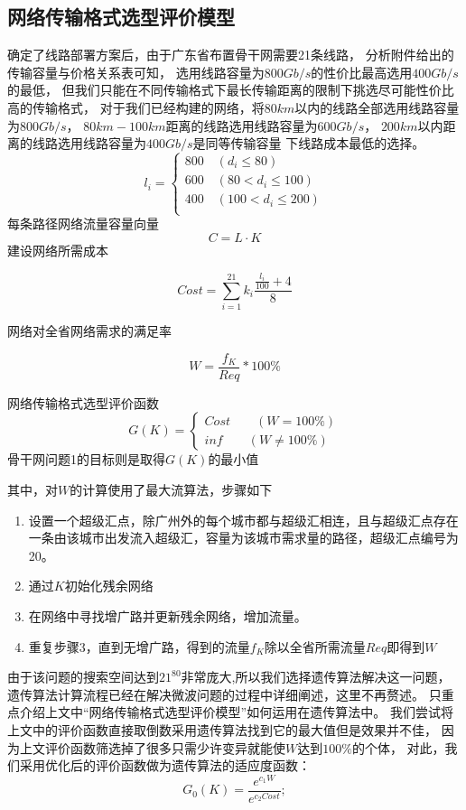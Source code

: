\documentclass[UTF8,12pt]{ctexart}
\begin{document}
    \subsection{网络传输格式选型评价模型}\label{WLCSGS}
    确定了线路部署方案后，由于广东省布置骨干网需要21条线路，
    分析附件给出的传输容量与价格关系表可知，
    选用线路容量为$800Gb/s$的性价比最高选用$400Gb/s$的最低，
    但我们只能在不同传输格式下最长传输距离的限制下挑选尽可能性价比高的传输格式，
    对于我们已经构建的网络，将$80km$以内的线路全部选用线路容量为$800Gb/s$，
    $80km-100km$距离的线路选用线路容量为$600Gb/s$，
    $200km$以内距离的线路选用线路容量为$400Gb/s$是同等传输容量
    下线路成本最低的选择。$$l_i=\begin{cases}
        800\quad (d_i\leqslant 80) \\
        600\quad  (80<d_i\leqslant 100)\\
        400\quad  (100<d_i\leqslant 200) \\
     \end{cases} $$
     每条路径网络流量容量向量$$C=L·K$$
     建设网络所需成本
     \begin{large}
         $$Cost=\sum_{i=1}^{21}k_i\frac{\frac{l_i}{100}+4}{8}$$
     \end{large}
     网络对全省网络需求的满足率
     \begin{large}
         $$W=\frac{f_K}{Req}*100\%$$
     \end{large}
     网络传输格式选型评价函数$$G(K)=\begin{cases}
         Cost \quad \quad (W=100\%)\\
         inf  \quad \quad (W\not=100\%)
     \end{cases}
     $$
     骨干网问题1的目标则是取得$G(K)$的最小值
     
     其中，对$W$的计算使用了最大流算法，步骤如下
     \begin{enumerate}
        \item 设置一个超级汇点，除广州外的每个城市都与超级汇相连，且与超级汇点存在一条由该城市出发流入超级汇，容量为该城市需求量的路径，超级汇点编号为20。
        \item 通过$K$初始化残余网络
        \item 在网络中寻找增广路并更新残余网络，增加流量。
        \item 重复步骤3，直到无增广路，得到的流量$f_K$除以全省所需流量$Req$即得到$W$
     \end{enumerate}
     
     由于该问题的搜索空间达到$21^{80}$非常庞大,所以我们选择遗传算法解决这一问题，
     遗传算法计算流程已经在解决微波问题的过程中详细阐述，这里不再赘述。
     只重点介绍上文中“网络传输格式选型评价模型”如何运用在遗传算法中。
     我们尝试将上文中的评价函数直接取倒数采用遗传算法找到它的最大值但是效果并不佳，
     因为上文评价函数筛选掉了很多只需少许变异就能使$W$达到$100\%$的个体，
     对此，我们采用优化后的评价函数做为遗传算法的适应度函数：
     $$G_0(K)=\frac{e^{c_1W}}{e^{c_2Cost}};$$
\end{document}
